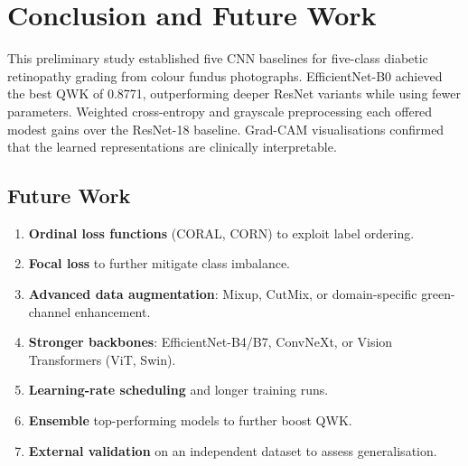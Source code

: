 \documentclass[12pt, a4paper]{article}
\begin{document}
\section{Conclusion and Future Work}
\label{sec:conclusion}

This preliminary study established five CNN baselines for five-class diabetic
retinopathy grading from colour fundus photographs.
EfficientNet-B0 achieved the best QWK of 0.8771, outperforming deeper ResNet
variants while using fewer parameters.
Weighted cross-entropy and grayscale preprocessing each offered modest gains over
the ResNet-18 baseline.
Grad-CAM visualisations confirmed that the learned representations are clinically
interpretable.

\subsection*{Future Work}

\begin{enumerate}[label=\arabic*.]
    \item \textbf{Ordinal loss functions} (CORAL, CORN) to exploit label ordering.
    \item \textbf{Focal loss} to further mitigate class imbalance.
    \item \textbf{Advanced data augmentation}: Mixup, CutMix, or domain-specific
          green-channel enhancement.
    \item \textbf{Stronger backbones}: EfficientNet-B4/B7, ConvNeXt, or
          Vision Transformers (ViT, Swin).
    \item \textbf{Learning-rate scheduling} and longer training runs.
    \item \textbf{Ensemble} top-performing models to further boost QWK.
    \item \textbf{External validation} on an independent dataset to assess
          generalisation.
\end{enumerate}
\end{document}
